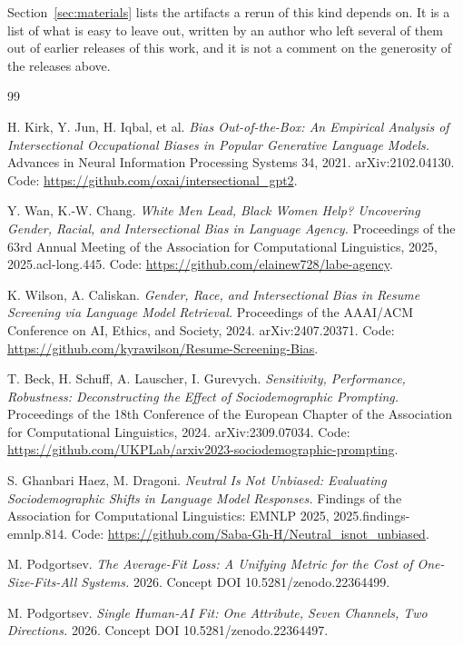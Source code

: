 \documentclass[11pt]{article}
\begin{document}
Section~\ref{sec:materials} lists the artifacts a rerun of this kind depends on.
It is a list of what is easy to leave out, written by an author who left several
of them out of earlier releases of this work, and it is not a comment on the
generosity of the releases above.



\begin{thebibliography}{99}

 H. Kirk, Y. Jun, H. Iqbal, et al. \emph{Bias Out-of-the-Box:
An Empirical Analysis of Intersectional Occupational Biases in Popular
Generative Language Models.} Advances in Neural Information Processing Systems
34, 2021. arXiv:2102.04130. Code: \url{https://github.com/oxai/intersectional_gpt2}.

 Y. Wan, K.-W. Chang. \emph{White Men Lead, Black Women Help?
Uncovering Gender, Racial, and Intersectional Bias in Language Agency.}
Proceedings of the 63rd Annual Meeting of the Association for Computational
Linguistics, 2025, 2025.acl-long.445. Code:
\url{https://github.com/elainew728/labe-agency}.

 K. Wilson, A. Caliskan. \emph{Gender, Race, and
Intersectional Bias in Resume Screening via Language Model Retrieval.}
Proceedings of the AAAI/ACM Conference on AI, Ethics, and Society, 2024.
arXiv:2407.20371. Code: \url{https://github.com/kyrawilson/Resume-Screening-Bias}.

 T. Beck, H. Schuff, A. Lauscher, I. Gurevych.
\emph{Sensitivity, Performance, Robustness: Deconstructing the Effect of
Sociodemographic Prompting.} Proceedings of the 18th Conference of the European
Chapter of the Association for Computational Linguistics, 2024.
arXiv:2309.07034. Code:
\url{https://github.com/UKPLab/arxiv2023-sociodemographic-prompting}.

 S. Ghanbari Haez, M. Dragoni. \emph{Neutral Is Not
Unbiased: Evaluating Sociodemographic Shifts in Language Model Responses.}
Findings of the Association for Computational Linguistics: EMNLP 2025,
2025.findings-emnlp.814. Code:
\url{https://github.com/Saba-Gh-H/Neutral_isnot_unbiased}.

 M. Podgortsev. \emph{The Average-Fit Loss: A Unifying Metric for
the Cost of One-Size-Fits-All Systems.} 2026. Concept DOI
10.5281/zenodo.22364499.

 M. Podgortsev. \emph{Single Human-AI Fit: One Attribute, Seven
Channels, Two Directions.} 2026. Concept DOI 10.5281/zenodo.22364497.


\end{thebibliography}
\end{document}
